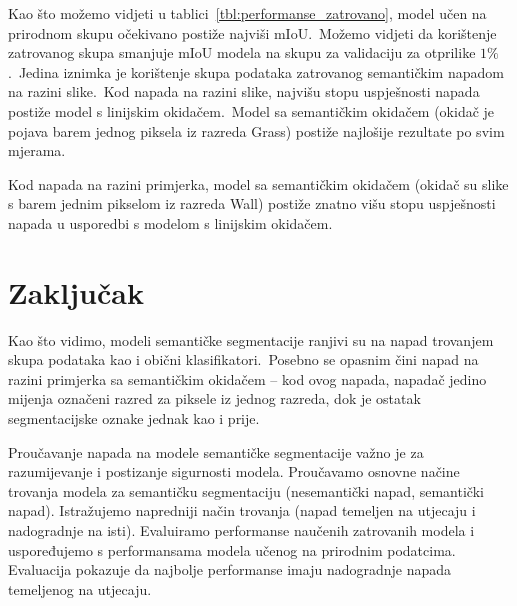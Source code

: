 \documentclass[times, utf8, seminar, numeric]{fer}
\begin{document}
Kao što možemo vidjeti u tablici~\ref{tbl:performanse_zatrovano}, model učen na prirodnom skupu očekivano postiže najviši mIoU.\ 
Možemo vidjeti da korištenje zatrovanog skupa smanjuje mIoU modela na skupu za validaciju za otprilike $1\%$.\ Jedina iznimka je korištenje skupa podataka zatrovanog semantičkim napadom na razini slike.\ 
Kod napada na razini slike, najvišu stopu uspješnosti napada postiže model s linijskim okidačem.\ Model sa semantičkim okidačem (okidač je pojava barem jednog piksela iz razreda Grass) postiže najlošije rezultate po svim mjerama.

Kod napada na razini primjerka, model sa semantičkim okidačem (okidač su slike s barem jednim pikselom iz razreda Wall) postiže znatno višu stopu uspješnosti napada u usporedbi s modelom s linijskim okidačem.


\chapter{Zaključak}

Kao što vidimo, modeli semantičke segmentacije ranjivi su na napad trovanjem skupa podataka kao i obični klasifikatori.\ 
Posebno se opasnim čini napad na razini primjerka sa semantičkim okidačem – kod ovog napada, napadač jedino mijenja označeni razred za piksele iz jednog razreda, dok je ostatak segmentacijske oznake jednak kao i prije.




\begin{sazetak}

    Proučavanje napada na modele semantičke segmentacije važno je za razumijevanje i postizanje sigurnosti modela. 
    Proučavamo osnovne načine trovanja modela za semantičku segmentaciju (nesemantički napad, semantički napad). 
    Istražujemo napredniji način trovanja (napad temeljen na utjecaju i nadogradnje na isti).
    Evaluiramo performanse naučenih zatrovanih modela i uspoređujemo s performansama modela učenog na prirodnim podatcima.
    Evaluacija pokazuje da najbolje performanse imaju nadogradnje napada temeljenog na utjecaju.
    

\end{sazetak}
    
\end{document}
